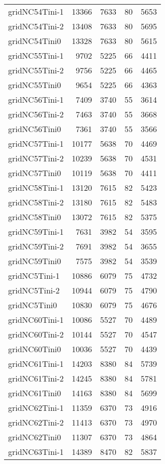 \documentclass[../../../thesis.tex]{subfiles}
\begin{document}
\begin{longtable}{lrrrr}
gridNC54Tini-1 & 13366 & 7633 & 80 & 5653 \\
gridNC54Tini-2 & 13408 & 7633 & 80 & 5695 \\
gridNC54Tini0 & 13328 & 7633 & 80 & 5615 \\
gridNC55Tini-1 & 9702 & 5225 & 66 & 4411 \\
gridNC55Tini-2 & 9756 & 5225 & 66 & 4465 \\
gridNC55Tini0 & 9654 & 5225 & 66 & 4363 \\
gridNC56Tini-1 & 7409 & 3740 & 55 & 3614 \\
gridNC56Tini-2 & 7463 & 3740 & 55 & 3668 \\
gridNC56Tini0 & 7361 & 3740 & 55 & 3566 \\
gridNC57Tini-1 & 10177 & 5638 & 70 & 4469 \\
gridNC57Tini-2 & 10239 & 5638 & 70 & 4531 \\
gridNC57Tini0 & 10119 & 5638 & 70 & 4411 \\
gridNC58Tini-1 & 13120 & 7615 & 82 & 5423 \\
gridNC58Tini-2 & 13180 & 7615 & 82 & 5483 \\
gridNC58Tini0 & 13072 & 7615 & 82 & 5375 \\
gridNC59Tini-1 & 7631 & 3982 & 54 & 3595 \\
gridNC59Tini-2 & 7691 & 3982 & 54 & 3655 \\
gridNC59Tini0 & 7575 & 3982 & 54 & 3539 \\
gridNC5Tini-1 & 10886 & 6079 & 75 & 4732 \\
gridNC5Tini-2 & 10944 & 6079 & 75 & 4790 \\
gridNC5Tini0 & 10830 & 6079 & 75 & 4676 \\
gridNC60Tini-1 & 10086 & 5527 & 70 & 4489 \\
gridNC60Tini-2 & 10144 & 5527 & 70 & 4547 \\
gridNC60Tini0 & 10036 & 5527 & 70 & 4439 \\
gridNC61Tini-1 & 14203 & 8380 & 84 & 5739 \\
gridNC61Tini-2 & 14245 & 8380 & 84 & 5781 \\
gridNC61Tini0 & 14163 & 8380 & 84 & 5699 \\
gridNC62Tini-1 & 11359 & 6370 & 73 & 4916 \\
gridNC62Tini-2 & 11413 & 6370 & 73 & 4970 \\
gridNC62Tini0 & 11307 & 6370 & 73 & 4864 \\
gridNC63Tini-1 & 14389 & 8470 & 82 & 5837 \\

\end{longtable}
\end{document}
